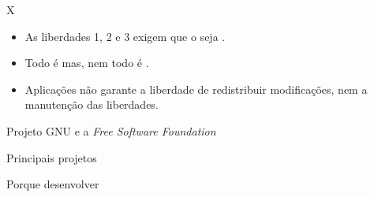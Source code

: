 \documentclass{beamer}
\begin{document}
\begin{frame}{\softwarelivre X \opensource}
   \begin{itemize}
     \item As liberdades 1, 2 e 3 exigem que o \softwarelivre seja \opensource.
        \item Todo \softwarelivre é \opensource mas, nem todo \opensource é
          \softwarelivre.
        \item Aplicações \opensource não garante a liberdade de redistribuir
          modificações, nem a manutenção das liberdades.
   \end{itemize}
\end{frame}

\begin{frame}{Projeto GNU e a \emph{Free Software Foundation}}
\end{frame}

\begin{frame}{Principais projetos}
\end{frame}


\begin{frame}{Porque desenvolver \softwarelivre}
\end{frame}

\begin{frame}
  \begin{center}
    \begin{shell}
    \end{shell}
  \end{center}
\end{frame}
\end{document}
